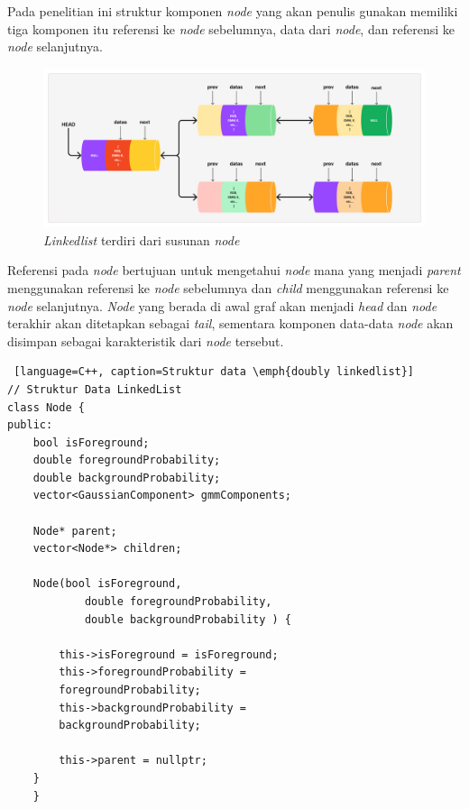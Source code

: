 Pada penelitian ini struktur komponen \emph{node} yang akan penulis gunakan 
memiliki tiga komponen itu referensi ke \emph{node} sebelumnya, data dari \emph{node},
dan referensi ke \emph{node} selanjutnya.

\begin{figure}[H]
	\centering{}
	\includegraphics[width=\textwidth]{gambar/linkedlist_example.png}
	\caption{\emph{Linkedlist} terdiri dari susunan \emph{node}}
\end{figure}

Referensi pada \emph{node} bertujuan untuk mengetahui \emph{node} mana yang 
menjadi \emph{parent} menggunakan referensi ke \emph{node} sebelumnya  dan 
\emph{child} menggunakan referensi ke \emph{node} selanjutnya. \emph{Node} yang berada di awal graf akan menjadi \emph{head} dan \emph{node}
terakhir akan ditetapkan sebagai \emph{tail}, sementara komponen data-data
\emph{node} akan disimpan sebagai karakteristik dari \emph{node} tersebut.

\begin{lstlisting} [language=C++, caption=Struktur data \emph{doubly linkedlist}]
// Struktur Data LinkedList
class Node {
public:
    bool isForeground;
    double foregroundProbability;
    double backgroundProbability;
    vector<GaussianComponent> gmmComponents;

    Node* parent;
    vector<Node*> children;

    Node(bool isForeground, 
            double foregroundProbability, 
            double backgroundProbability ) {

        this->isForeground = isForeground;
        this->foregroundProbability = 
        foregroundProbability;
        this->backgroundProbability = 
        backgroundProbability;
        
        this->parent = nullptr;
    }
 	}
\end{lstlisting}


